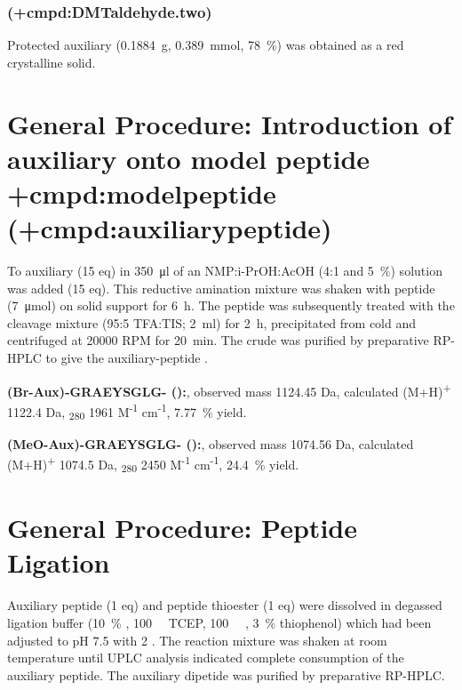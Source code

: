 {{    \subsubsection{ (\cmpd+{cmpd:DMTaldehyde.two})}
    Protected auxiliary  (\SI{0.1884}{\gram}, \SI{0.389}{\milli\mol}, \SI{78}{\percent}) was obtained as a red crystalline solid.


\section{General Procedure: Introduction of auxiliary onto model peptide \cmpd+{cmpd:modelpeptide} (\cmpd+{cmpd:auxiliarypeptide})}

To auxiliary  (15 eq) in \SI{350}{\micro\litre} of an NMP:i-PrOH:AcOH (4:1 and \SI{5}{\percent}) solution was added  (15 eq). This reductive amination mixture was shaken with peptide  (\SI{7}{\micro\mol}) on solid support for \SI{6}{\hour}. The peptide was subsequently treated with the cleavage mixture (95:5 TFA:TIS; \SI{2}{\milli\litre}) for \SI{2}{\hour}, precipitated from cold  and centrifuged at 20000 RPM for \SI{20}{\minute}. The crude was purified by preparative RP-HPLC to give the auxiliary-peptide .

\textbf{(Br-Aux)-GRAEYSGLG- ():}, observed mass 1124.45 Da, calculated (M+H)\textsuperscript{+} 1122.4 Da, \textepsilon\textsubscript{280} 1961 M\textsuperscript{-1} cm\textsuperscript{-1}, \SI{7.77}{\percent} yield.

\textbf{(MeO-Aux)-GRAEYSGLG- ():}, observed mass 1074.56 Da, calculated (M+H)\textsuperscript{+} 1074.5 Da, \textepsilon\textsubscript{280} 2450 M\textsuperscript{-1} cm\textsuperscript{-1}, \SI{24.4}{\percent} yield.


\section{General Procedure: Peptide Ligation}

Auxiliary peptide  (1 eq) and peptide thioester  (1 eq) were dissolved in degassed ligation buffer (\SI{10}{\percent} , \SI{100}{\milli\Molar} TCEP, \SI{100}{\milli\Molar} , \SI{3}{\percent} thiophenol) which had been adjusted to pH 7.5 with \SI{2}{\Molar} . The reaction mixture was shaken at room temperature until UPLC analysis indicated complete consumption of the auxiliary peptide. The auxiliary dipetide was purified by preparative RP-HPLC.

}}
